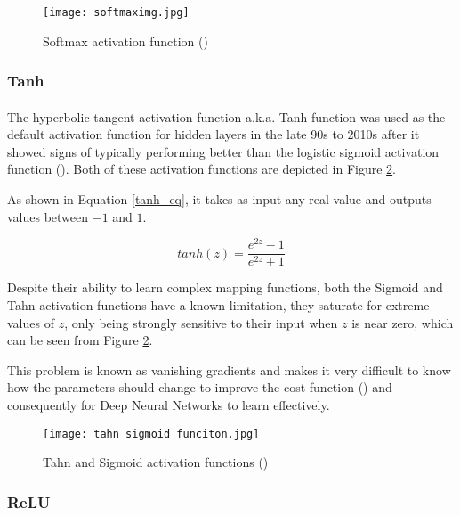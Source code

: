 \begin{figure}[hbt!]
    \centering
    \texttt{[image: softmaximg.jpg]}
    \caption{Softmax activation function (\cite{softmaxpic})}
    \label{fig_softmax}
\end{figure}

\subsubsection{Tanh}
\paragraph{}
The hyperbolic tangent activation function \gls{a.k.a.} Tanh function was used as the default activation function for hidden layers in the late 90s to 2010s after it showed signs of typically performing better than the logistic sigmoid activation function (\cite{GoodBengCour16}).
Both of these activation functions are depicted in Figure \ref{fig_tahn_sigmoid}.

As shown in Equation \ref{tanh_eq}, it takes as input any real value and outputs values between $-1$ and $1$.

\begin{equation}
    \label{tanh_eq}
    tanh(z) = \frac{e^{2z} - 1}{ e^{2z} + 1} 
\end{equation}

Despite their ability to learn complex mapping functions, both the Sigmoid and Tahn activation functions have a known limitation, they saturate for extreme values of $z$, only being strongly sensitive to their input when $z$ is near zero, which can be seen from Figure \ref{fig_tahn_sigmoid}. 

This problem is known as vanishing gradients and makes it very difficult to know how the parameters should change to improve the cost function (\cite{GoodBengCour16}) and consequently for Deep Neural Networks to learn effectively.

\begin{figure}[hbt!]
    \centering
    \texttt{[image: tahn sigmoid funciton.jpg]}
    \caption{Tahn and Sigmoid activation functions (\cite{tahnfunc})}
    \label{fig_tahn_sigmoid}

\end{figure}

\subsubsection{\gls{ReLU}}
